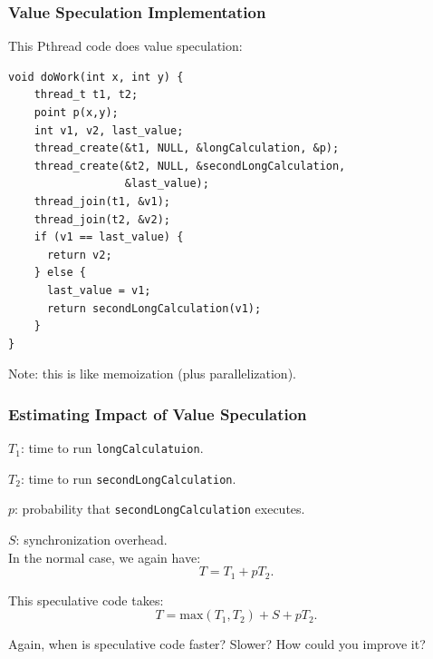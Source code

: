 \documentclass[aspectratio=43]{beamer}
\newenvironment{changemargin}[1]{%
  \begin{list}{}{%
    \setlength{\topsep}{0pt}%
    \setlength{\leftmargin}{#1}%
    \setlength{\rightmargin}{1em}
    \setlength{\listparindent}{\parindent}%
    \setlength{\itemindent}{\parindent}%
    \setlength{\parsep}{\parskip}%
  }%
  \item[]}{\end{list}}
\begin{document}
\begin{frame}[fragile]
  \frametitle{Value Speculation Implementation}

  \begin{changemargin}{2cm}
  This Pthread code does value speculation:
  
  \begin{lstlisting}
void doWork(int x, int y) {
    thread_t t1, t2;
    point p(x,y);
    int v1, v2, last_value;
    thread_create(&t1, NULL, &longCalculation, &p);
    thread_create(&t2, NULL, &secondLongCalculation,
                  &last_value);
    thread_join(t1, &v1);
    thread_join(t2, &v2);
    if (v1 == last_value) {
      return v2;
    } else {
      last_value = v1;
      return secondLongCalculation(v1);
    }
}
  \end{lstlisting}

  Note: this is like memoization (plus parallelization).
  \end{changemargin}
\end{frame}

\begin{frame}
  \frametitle{Estimating Impact of Value Speculation}

  \begin{changemargin}{2.5cm}
  $T_1$: time to run {\tt longCalculatuion}.

  $T_2$: time to run {\tt secondLongCalculation}.

  $p$: probability that {\tt secondLongCalculation} executes.

  $S$: synchronization overhead.\\[1em]

  In the normal case, we again have:
    \[ T = T_1 +pT_2.\]

  This speculative code takes:
    \[ T = \mbox{max}(T_1, T_2) + S + pT_2.\]

     Again, when is speculative code faster? Slower? How could you improve it?

  \end{changemargin}
\end{frame}
\end{document}
